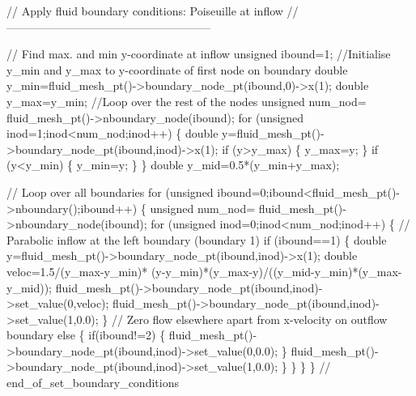 \begin{DoxyCodeInclude}


 \textcolor{comment}{// Apply fluid boundary conditions: Poiseuille at inflow}
 \textcolor{comment}{//------------------------------------------------------}

 \textcolor{comment}{// Find max. and min y-coordinate at inflow}
 \textcolor{keywordtype}{unsigned} ibound=1;
 \textcolor{comment}{//Initialise y\_min and y\_max to y-coordinate of first node on boundary}
 \textcolor{keywordtype}{double} y\_min=fluid\_mesh\_pt()->boundary\_node\_pt(ibound,0)->x(1);
 \textcolor{keywordtype}{double} y\_max=y\_min;
 \textcolor{comment}{//Loop over the rest of the nodes}
 \textcolor{keywordtype}{unsigned} num\_nod= fluid\_mesh\_pt()->nboundary\_node(ibound);
 \textcolor{keywordflow}{for} (\textcolor{keywordtype}{unsigned} inod=1;inod<num\_nod;inod++)
  \{
   \textcolor{keywordtype}{double} y=fluid\_mesh\_pt()->boundary\_node\_pt(ibound,inod)->x(1);
   \textcolor{keywordflow}{if} (y>y\_max)
    \{
     y\_max=y;
    \}
   \textcolor{keywordflow}{if} (y<y\_min)
    \{
     y\_min=y;
    \}
  \}
 \textcolor{keywordtype}{double} y\_mid=0.5*(y\_min+y\_max);
 
 \textcolor{comment}{// Loop over all boundaries}
 \textcolor{keywordflow}{for} (\textcolor{keywordtype}{unsigned} ibound=0;ibound<fluid\_mesh\_pt()->nboundary();ibound++)
  \{
   \textcolor{keywordtype}{unsigned} num\_nod= fluid\_mesh\_pt()->nboundary\_node(ibound);
   \textcolor{keywordflow}{for} (\textcolor{keywordtype}{unsigned} inod=0;inod<num\_nod;inod++)
    \{
     \textcolor{comment}{// Parabolic inflow at the left boundary (boundary 1)}
     \textcolor{keywordflow}{if} (ibound==1)
      \{
       \textcolor{keywordtype}{double} y=fluid\_mesh\_pt()->boundary\_node\_pt(ibound,inod)->x(1);
       \textcolor{keywordtype}{double} veloc=1.5/(y\_max-y\_min)*
        (y-y\_min)*(y\_max-y)/((y\_mid-y\_min)*(y\_max-y\_mid));
       fluid\_mesh\_pt()->boundary\_node\_pt(ibound,inod)->set\_value(0,veloc);
       fluid\_mesh\_pt()->boundary\_node\_pt(ibound,inod)->set\_value(1,0.0);
      \}
     \textcolor{comment}{// Zero flow elsewhere apart from x-velocity on outflow boundary}
     \textcolor{keywordflow}{else}
      \{
       \textcolor{keywordflow}{if}(ibound!=2)
        \{
         fluid\_mesh\_pt()->boundary\_node\_pt(ibound,inod)->set\_value(0,0.0);
        \}
       fluid\_mesh\_pt()->boundary\_node\_pt(ibound,inod)->set\_value(1,0.0);
      \}
    \}
  \}
\} \textcolor{comment}{// end\_of\_set\_boundary\_conditions}

\end{DoxyCodeInclude}




